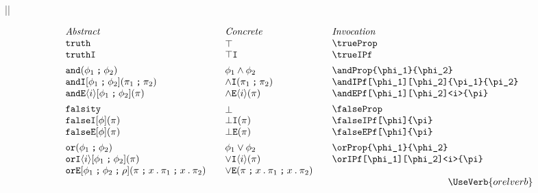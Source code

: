 \documentclass[11pt]{article}
\begin{document}
||
\begin{figure}

  \begin{small}
    \begin{displaymath}
      \begin{array}{l@{\qquad}l@{\qquad}l@{\qquad}l}
        \textit{Abstract} & \textit{Concrete} & \textit{Invocation} \\
        \trueProp                                       & \trueProp*                       & \verb|\trueProp|                                       \\
        \trueIPf                                        & \trueIPf*                        & \verb|\trueIPf|                                        \\[1ex]

        \andProp{\phi_1}{\phi_2}                        & \andProp*{\phi_1}{\phi_2}        & \verb|\andProp{\phi_1}{\phi_2}|                        \\
        \andIPf[\phi_1][\phi_2]{\pi_1}{\pi_2}                           & \andIPf*{\pi_1}{\pi_2}           & \verb|\andIPf[\phi_1][\phi_2]{\pi_1}{\pi_2}|                           \\
        \andEPf[\phi_1][\phi_2]<i>{\pi}                 & \andEPf*<i>{\pi}                 & \verb|\andEPf[\phi_1][\phi_2]<i>{\pi}|                 \\[1ex]

        \falseProp                                      & \falseProp*                      & \verb|\falseProp|                                      \\
        \falseIPf[\phi]{\pi}                            & \falseIPf*{\pi}                  & \verb|\falseIPf[\phi]{\pi}|                            \\
        \falseEPf[\phi]{\pi}                            & \falseEPf*{\pi}                  & \verb|\falseEPf[\phi]{\pi}|                            \\[1ex]

        \orProp{\phi_1}{\phi_2}                         & \orProp*{\phi_1}{\phi_2}         & \verb|\orProp{\phi_1}{\phi_2}|                         \\
        \orIPf[\phi_1][\phi_2]<i>{\pi}                  & \orIPf*<i>{\pi}                  & \verb|\orIPf[\phi_1][\phi_2]<i>{\pi}|                 \\
        \orEPf[\phi_1][\phi_2][\rho]{\pi}{x}{\pi_1}{x}{\pi_2} &
        \orEPf*{\pi}{x}{\pi_1}{x}{\pi_2} & \\
        \multicolumn{3}{r}{\UseVerb{orelverb}} \\[1ex]


\end{array}
\end{displaymath}
\end{small}
\end{figure}
\end{document}
